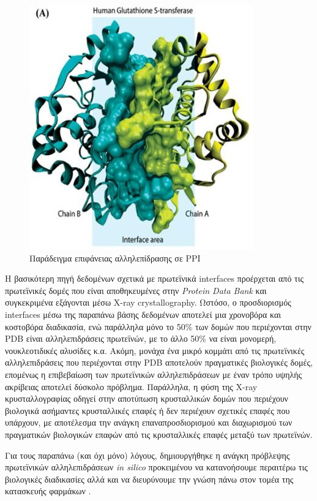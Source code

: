 \medskip
\begin{figure}[h]
  \centering
  \includegraphics[scale=1]{images/protein interface.JPG}
  \caption{Παράδειγμα επιφάνειας αλληλεπίδρασης σε PPI}
  \label{fig:protein interface}
\end{figure}

\medskip
Η βασικότερη πηγή δεδομένων σχετικά με πρωτεϊνικά interfaces προέρχεται από τις πρωτεϊνικές δομές που είναι αποθηκευμένες στην \textit{Protein Data Bank} και συγκεκριμένα εξάγονται μέσω X-ray crystallography. Ωστόσο, ο προσδιορισμός interfaces μέσω της παραπάνω βάσης δεδομένων αποτελεί μια χρονοβόρα και κοστοβόρα διαδικασία, ενώ παράλληλα μόνο το 50\% των δομών που περιέχονται στην PDB είναι αλληλεπιδράσεις πρωτεϊνών, με το άλλο 50\% να είναι μονομερή, νουκλεοτιδικές αλυσίδες κ.α. Ακόμη, μονάχα ένα μικρό κομμάτι από τις πρωτεϊνικές αλληλεπιδράσεις που περιέχονται στην PDB αποτελούν πραγματικές βιολογικές δομές, επομένως η επιβεβαίωση των πρωτεϊνικών αλληλεπιδράσεων με έναν τρόπο υψηλής ακρίβειας αποτελεί δύσκολο πρόβλημα. Παράλληλα, η φύση της X-ray κρυσταλλογραφίας οδηγεί στην αποτύπωση κρυσταλλικών δομών που περιέχουν βιολογικά ασήμαντες κρυσταλλικές επαφές ή δεν περιέχουν σχετικές επαφές που υπάρχουν, με αποτέλεσμα την ανάγκη επαναπροσδιορισμού και διαχωρισμού των πραγματικών βιολογικών επαφών από τις κρυσταλλικές επαφές μεταξύ των πρωτεϊνών.

\medskip
Για τους παραπάνω (και όχι μόνο) λόγους, δημιουργήθηκε η ανάγκη πρόβλεψης πρωτεϊνικών αλληλεπιδράσεων \textit{in silico} προκειμένου να κατανοήσουμε περαιτέρω τις βιολογικές διαδικασίες αλλά και να διευρύνουμε την γνώση πάνω στον τομέα της κατασκευής φαρμάκων \cite{Fletcher2006}. 

